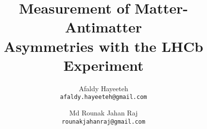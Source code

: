 \title{Measurement of Matter-Antimatter \\[0.75em] Asymmetries with the LHCb Experiment}


\author{Afaldy Hayeeteh\\ \texttt{afaldy.hayeeteh@gmail.com} \and Md Rounak Jahan Raj \\ \texttt{rounakjahanraj@gmail.com}}




\maketitle




